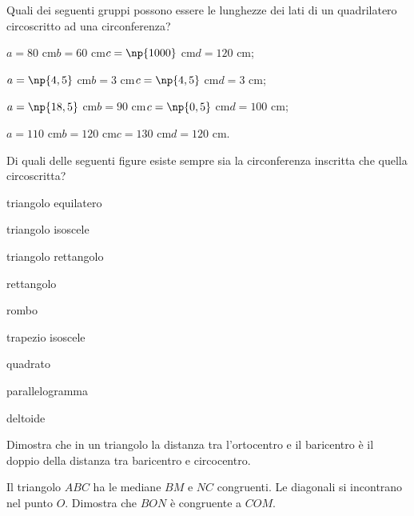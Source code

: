 \begin{esercizio}
\label{ese:5.42}
Quali dei seguenti gruppi possono essere le lunghezze dei lati di un 
quadrilatero circoscritto ad una circonferenza?
\begin{enumeratea}
\item \(a=80\) cm\tab	\(b=60\) cm\tab \(c=\np{1000}\) cm\tab \(d=120\) cm;
\item \(a=\np{4,5}\) cm\tab \(b=3\) cm\tab \(c=\np{4,5}\) cm\tab \(d=3\) cm;
\item \(a=\np{18,5}\) cm\tab \(b=90\) cm\tab \(c=\np{0,5}\) cm\tab \(d=100\) 
cm;
\item \(a=110\) cm\tab \(b=120\) cm\tab \(c=130\) cm\tab \(d=120\) cm.
\end{enumeratea}
\end{esercizio}

\begin{esercizio}
\label{ese:5.43}
Di quali delle seguenti figure esiste sempre sia la circonferenza 
inscritta che quella circoscritta?
\begin{multicols}{2}
\begin{enumeratea}
\item triangolo equilatero\tab\boxV\quad\boxF
\item triangolo isoscele\tab\boxV\quad\boxF
\item triangolo rettangolo\tab\boxV\quad\boxF
\item rettangolo\tab\tab\boxV\quad\boxF
\item rombo\tab\tab\tab\boxV\quad\boxF
\item trapezio isoscele\tab\boxV\quad\boxF
\item quadrato\tab\tab\boxV\quad\boxF
\item parallelogramma\tab\boxV\quad\boxF
\item deltoide\tab\tab\boxV\quad\boxF
\end{enumeratea}
\end{multicols}
\end{esercizio}

\begin{esercizio}
\label{ese:5.44}
Dimostra che in un triangolo la distanza tra l’ortocentro e il 
baricentro è il doppio della distanza tra baricentro e circocentro.
\end{esercizio}

\begin{esercizio}
\label{ese:5.45}
Il triangolo \(ABC\) ha le mediane \(BM\) e \(NC\) congruenti. Le diagonali 
si incontrano nel punto \(O\). Dimostra che \(BON\) è congruente a \(COM\).
\end{esercizio}

